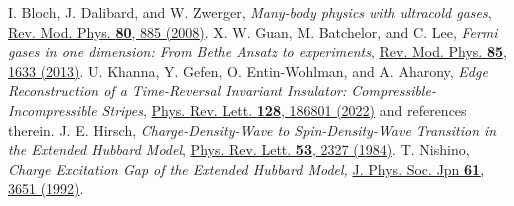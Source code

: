 \documentclass[aps,prl,showpacs,twocolumn,superscriptaddress]{revtex4-2}
\begin{document}
\begin{thebibliography}{99}

I. Bloch, J. Dalibard, and W. Zwerger,
{\it Many-body physics with ultracold gases},
\href{https://journals.aps.org/rmp/abstract/10.1103/RevModPhys.80.885}{Rev. Mod. Phys. {\bf 80}, 885 (2008)}. %
X. W. Guan, M. Batchelor, and C. Lee,
{\it Fermi gases in one dimension: From Bethe Ansatz to experiments},
\href{https://journals.aps.org/rmp/abstract/10.1103/RevModPhys.85.1633}{Rev. Mod. Phys. {\bf 85}, 1633 (2013)}.
 U. Khanna, Y. Gefen, O. Entin-Wohlman, and A. Aharony,
{\it Edge Reconstruction of a Time-Reversal Invariant Insulator: Compressible-Incompressible Stripes},
\href{https://journals.aps.org/prl/abstract/10.1103/PhysRevLett.128.186801}
{Phys. Rev. Lett. {\bf 128}, 186801 (2022)} and references therein.
J. E. Hirsch,
{\it Charge-Density-Wave to Spin-Density-Wave Transition in the Extended Hubbard Model},
\href{https://journals.aps.org/prl/abstract/10.1103/PhysRevLett.53.2327}
{Phys. Rev. Lett. {\bf 53}, 2327 (1984)}.
T. Nishino,
{\it Charge Excitation Gap of the Extended Hubbard Model,}
\href{https://doi.org/10.1143/JPSJ.61.3651}{J. Phys. Soc. Jpn {\bf 61}, 3651 (1992)}.

\end{thebibliography}
\end{document}
